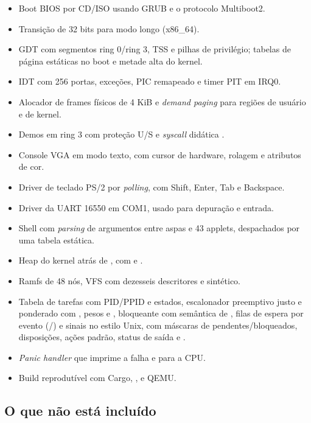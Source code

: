 \begin{itemize}
  \item Boot BIOS por CD/ISO usando GRUB e o protocolo Multiboot2.
  \item Transi\c{c}\~ao de 32 bits para modo longo (x86\_64).
  \item GDT com segmentos ring 0/ring 3, TSS e pilhas de privil\'egio;
        tabelas de p\'agina est\'aticas no boot e metade alta do kernel.
  \item IDT com 256 portas, exce\c{c}\~oes, PIC remapeado e timer PIT em IRQ0.
  \item Alocador de frames f\'isicos de 4 KiB e \emph{demand paging} para
        regi\~oes de usu\'ario e de kernel.
  \item Demos em ring 3 com prote\c{c}\~ao U/S e \emph{syscall} did\'atica
        .
  \item Console VGA em modo texto, com cursor de hardware, rolagem e
        atributos de cor.
  \item Driver de teclado PS/2 por \emph{polling}, com Shift, Enter, Tab e
        Backspace.
  \item Driver da UART 16550 em COM1, usado para depura\c{c}\~ao e entrada.
  \item Shell com \emph{parsing} de argumentos entre aspas e 43 applets,
        despachados por uma tabela est\'atica.
  \item Heap do kernel atr\'as de , com
         e .
  \item Ramfs de 48 n\'os, VFS com dezesseis descritores e 
        sint\'etico.
  \item Tabela de tarefas com PID/PPID e estados, escalonador preemptivo
        justo e ponderado com , pesos e ,
         bloqueante com sem\^antica de ,
        filas de espera por evento (/) e
        sinais no estilo Unix, com m\'ascaras de pendentes/bloqueados,
        disposi\c{c}\~oes, a\c{c}\~oes padr\~ao, status de sa\'ida e .
  \item \emph{Panic handler} que imprime a falha e para a CPU.
  \item Build reprodut\'ivel com Cargo, , 
        e QEMU.
\end{itemize}

\subsection*{O que n\~ao est\'a inclu\'ido}

